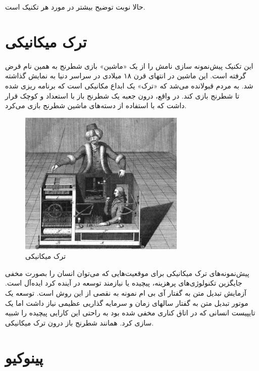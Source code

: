 حالا نوبت توضیح بیشتر در مورد هر تکنیک است.

\section{ترک
میکانیکی}\label{ux62aux631ux6a9-ux645ux6ccux6a9ux627ux646ux6ccux6a9ux6cc}

این تکنیک پیش‌نمونه سازی نامش را از یک «ماشین» بازی شطرنج به همین نام
قرض گرفته است. این ماشین در انتهای قرن ۱۸ میلادی در سراسر دنیا به نمایش
گذاشته شد. به مردم قبولانده می‌شد که «ترک» یک ابداع مکانیکی است که
برنامه ریزی شده تا شطرنج بازی کند. در واقع، درون جعبه یک شطرنج باز با
استعداد و کوچک قرار داشت که با استفاده از دسته‌های ماشین شطرنج بازی
می‌کرد.

\begin{figure}[htbp]
\centering
\includegraphics{mechanicaltork.png}
\caption{ترک میکانیکی}
\end{figure}

پیش‌نمونه‌های ترک میکانیکی برای موقعیت‌هایی که می‌توان انسان را بصورت
مخفی جایگزین تکنولوژی‌های پرهزینه، پیچیده یا نیازمند توسعه در آینده کرد
ایده‌آل است. آزمایش تبدیل متن به گفتار آی بی ام نمونه به نقصی از این روش
است. توسعه یک موتور تبدیل متن به گفتار سالهای زمان و سرمایه گذاریی عظیمی
نیاز داشت اما یک تایپیست انسانی که در اتاق کناری مخفی شده بود به راحتی
این کارایی پیچیده را شبیه سازی کرد. همانند شطرنج باز درون ترک میکانیکی.

\section{پینوکیو}\label{ux67eux6ccux646ux648ux6a9ux6ccux648}
